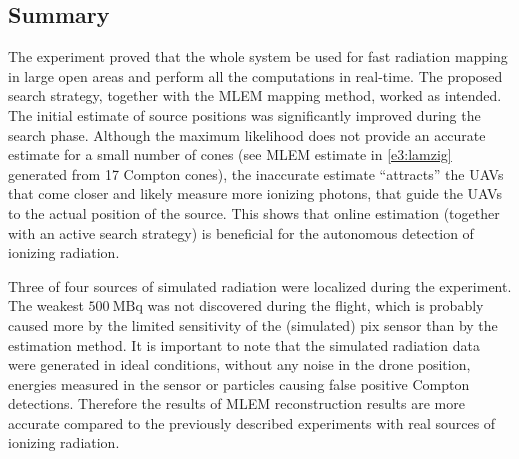 \subsection{Summary}
The experiment proved that the whole system be used for fast radiation mapping in large open areas and perform all the computations in real-time.
The proposed search strategy, together with the \ac{MLEM} mapping method, worked as intended.
The initial estimate of source positions was significantly improved during the search phase.
Although the maximum likelihood does not provide an accurate estimate for a small number of cones (see \ac{MLEM} estimate in \autoref{e3:lamzig} generated from 17 Compton cones), the inaccurate estimate ``attracts'' the \ac{UAV}s that come closer and likely measure more ionizing photons, that guide the \ac{UAV}s to the actual position of the source.
This shows that online estimation (together with an active search strategy) is beneficial for the autonomous detection of ionizing radiation.

Three of four sources of simulated radiation were localized during the experiment.
The weakest $\SI{500}{\mega\becquerel}$ was not discovered during the flight, which is probably caused more by the limited sensitivity of the (simulated) \ac{pix} sensor than by the estimation method. It is important to note that the simulated radiation data were generated in ideal conditions, without any noise in the drone position, energies measured in the sensor or particles causing false positive Compton detections.
Therefore the results of \ac{MLEM} reconstruction results are more accurate compared to the previously described experiments with real sources of ionizing radiation.



